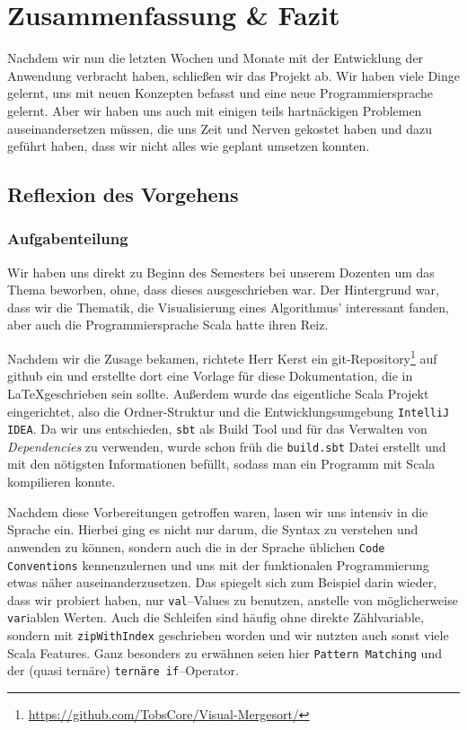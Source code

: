 \chapter{Zusammenfassung \& Fazit}\label{chap:zusammenfassung-und-fazit}

Nachdem wir nun die letzten Wochen und Monate mit der Entwicklung der Anwendung verbracht haben, schließen wir das Projekt ab. Wir haben viele Dinge gelernt, uns mit neuen Konzepten befasst und eine neue Programmiersprache gelernt. Aber wir haben uns auch mit einigen teils hartnäckigen Problemen auseinandersetzen müssen, die uns Zeit und Nerven gekostet haben und dazu geführt haben, dass wir nicht alles wie geplant umsetzen konnten.

\section{Reflexion des Vorgehens}\label{sec:reflexion}
\subsection{Aufgabenteilung}
Wir haben uns direkt zu Beginn des Semesters bei unserem Dozenten um das Thema beworben, ohne, dass dieses ausgeschrieben war. Der Hintergrund war, dass wir die Thematik, die Visualisierung eines Algorithmus' interessant fanden, aber auch die Programmiersprache Scala hatte ihren Reiz.

Nachdem wir die Zusage bekamen, richtete Herr Kerst ein git-Repository\footnote{\url{https://github.com/TobsCore/Visual-Mergesort/}} auf github ein und erstellte dort eine Vorlage für diese Dokumentation, die in \LaTeX geschrieben sein sollte. Außerdem wurde das eigentliche Scala Projekt eingerichtet, also die Ordner-Struktur und die Entwicklungsumgebung \texttt{IntelliJ IDEA}. Da wir uns entschieden, \texttt{sbt} als Build Tool und für das Verwalten von \textit{Dependencies} zu verwenden, wurde schon früh die \texttt{build.sbt} Datei erstellt und mit den nötigsten Informationen befüllt, sodass man ein Programm mit Scala kompilieren konnte.

Nachdem diese Vorbereitungen getroffen waren, lasen wir uns intensiv in die Sprache ein. Hierbei ging es nicht nur darum, die Syntax zu verstehen und anwenden zu können, sondern auch die in der Sprache üblichen \texttt{Code Conventions} kennenzulernen und uns mit der funktionalen Programmierung etwas näher auseinanderzusetzen. Das spiegelt sich zum Beispiel darin wieder, dass wir probiert haben, nur \texttt{val}--Values zu benutzen, anstelle von möglicherweise \texttt{var}iablen Werten. Auch die Schleifen sind häufig ohne direkte Zählvariable, sondern mit \texttt{zipWithIndex} geschrieben worden und wir nutzten auch sonst viele Scala Features. Ganz besonders zu erwähnen seien hier \texttt{Pattern Matching} und der (quasi ternäre) \texttt{ternäre if}--Operator.


